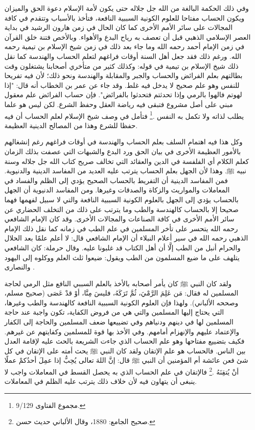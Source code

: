 وفي ذلك الحكمة البالغة من الله جل جلاله حتى يكون لأمة الإسلام دعوة الحق والميزان ويكون الحساب مفتاحا للعلوم الكونية السببية النافعة، فتأخذ بالأسباب وتتقدم في كافة المجالات على سائر الأمم الأخرى كما كان الحال في زمن هارون الرشيد في بداية العصر الإسلامي الذهبي قبل أن تعصف به رياح البدع والأهواء. وبالأخص فتنة خلق القرآن في زمن الإمام أحمد رحمه الله وما جاء بعد ذلك في زمن شيخ الإسلام بن تيمية رحمه الله. ورغم ذلك فقد جعل أهل السنة أوقات فراغهم لتعلم الحساب والهندسة كما نقل ذلك شيخ الإسلام بن تيمية في قوله: وكذلك كثير من متأخري أصحابنا يشتغلون وقت بطالتهم بعلم الفرائض والحساب والجبر والمقابلة والهندسة ونحو ذلك؛ لأن فيه تفريحا للنفس وهو علم صحيح لا يدخل فيه غلط. وقد جاء عن عمر بن الخطاب أنه قال: "إذا لهوتم فالهوا بالرمي وإذا تحدثتم فتحدثوا بالفرائض". فإن حساب الفرائض علم معقول مبني على أصل مشروع فتبقى فيه رياضة العقل وحفظ الشرع. لكن ليس هو علما يطلب لذاته ولا تكمل به النفس \href{https://shamela.ws/book/7289/4394#p1}{\faExternalLink} \cite{ibnTaimia_Majmoo}.\footnote{مجموع الفتاوى 9/129.} فتأمل في وصف شيخ الإسلام لعلم الحساب أن فيه حفظا للشرع وهذا من المصالح الدينية العظيمة.

وكل هذا فيه اهتمام السلف بعلم الحساب والهندسة في أوقات فراغهم رغم إنشغالهم بالأمور العظيمة الأخرى في بيان الحق ورد البدع والشبهات التي عصفت بذلك الزمان كعلم الكلام أي الفلفسة في الدين والعقائد التي تخالف صريح كتاب الله جل جلاله وسنة نبيه ﷺ. وهذا لأن الجهل بعلم الحساب يترتب عليه العديد من المفاسد الدينية والدنيوية. فمن المفاسد الدينية أن التفريط بالحساب الصحيح يؤدي إلى الظلم والفساد في المعاملات والمواريث والزكاة والصدقات وغيرها. ومن المفاسد الدنيوية أن الجهل بالحساب يؤدي إلى الجهل بالعلوم الكونية السببية النافعة والتي لا سبيل لفهمها فهما صحيحا إلا بالحساب كالهندسة والطب وما يترتب على ذلك من التخلف الحضاري عن سائر الأمم الأخرى في كافة الصناعات والمجالات الأخرى. وقد كان الإمام الشافعي رحمه الله يتحسر على تأخر المسلمين في علم الطب في زمانه كما نقل ذلك الإمام الذهبي رحمه الله في سير أعلام النبلاء أن الإمام الشافعي قال: لا أعلم علمًا بعد الحلال والحرام أنبل من الطب إلَّا أن أهل الكتاب قد غلبونا عليه. وقال حرملة: كان الشافعي يتلهف على ما ضيع المسلمون من الطب ويقول: ضيعوا ثلث العلم ووكلوه إلى اليهود والنصارى \href{https://shamela.ws/book/22669/4486#p7}{\faExternalLink} \cite{dahabi_Siyar}. 

ولقد كان النبي ﷺ كان يأمر أصحابه بالأخذ بالعلم السببي النافع مثل الرمي لحاجة المسلمين له فقال: مَن عَلِمَ الرَّمْيَ، ثُمَّ تَرَكَهُ، فليسَ مِنَّا، أوْ قدْ عَصَى {\footnotesize (صحيح مسلم، وصححه الألباني)}. ولهذا فإن العلوم الكونية السببية النافعة كالهندسة والطب وغيرها، التي يحتاج إليها المسلمين والتي هي من فروض الكفاية، تكون واجبة عند حاجة المسلمين لها في دينهم ودنياهم وفي تضييعها ضعف المسلمين والحاجة إلى الكفار والإعتماد عليهم والإنهزام أمامهم. وفي الأخذ بها قوة للمسلمين وكفايتهم عن غيرهم. فكيف بتضييع مفتاحها وهو علم الحساب الذي جاءت الشريعة بالحث عليه لإقامة العدل بين الناس. فالحساب هو علم الإتقان ولقد كان النبي ﷺ يحث أمته على الإتقان في كل شئ فعن عائشة أم المؤمنين أن النبي ﷺ قال: إنَّ اللهَ تعالى يُحِبُّ إذا عمِلَ أحدُكمْ عملًا أنْ يُتقِنَهُ \href{https://shamela.ws/book/21659/2761#p1}{\faExternalLink} \cite{jamaaSagheer}.\footnote{صحيح الجامع: 1880، وقال الألباني حديث حسن.} فالإتقان في علم الحساب الذي به يحصل القسط في المعاملات واجب لا ينبغى أن يتهاون فيه لأن خلاف ذلك يترتب عليه الظلم في المعاملات.

